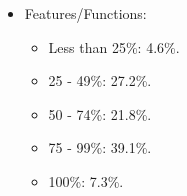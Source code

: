 \documentclass[10pt]{article}
\begin{document}
\begin{multicols}{5}
\begin{block}
\begin{itemize}
\begin{itemize}
\begin{itemize}
        \item 101 - 200\%: 35.5\%.
        \item 201 - 400\%: 11.2\%.
        \item Over 400\%: 1.1\%.
      \end{itemize}
      \item Features/Functions:
      \begin{itemize}
        \item Less than 25\%: 4.6\%.
        \item 25 - 49\%: 27.2\%.
        \item 50 - 74\%: 21.8\%.
        \item 75 - 99\%: 39.1\%.
        \item 100\%: 7.3\%.
      \end{itemize}
    \end{itemize}
  \end{itemize}
  \end{block}


\end{multicols}
\end{document}
